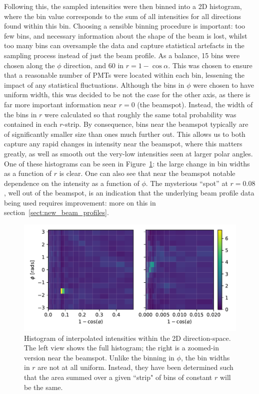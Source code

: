 Following this, the sampled intensities were then binned into a 2D histogram, where the bin value corresponds to the sum of all intensities for all directions found within this bin. Choosing a sensible binning procedure is important: too few bins, and necessary information about the shape of the beam is lost, whilst too many bins can oversample the data and capture statistical artefacts in the sampling process instead of just the beam profile. As a balance, 15 bins were chosen along the $\phi$ direction, and 60 in $r=1-\cos\alpha$. This was chosen to ensure that a reasonable number of PMTs were located within each bin, lessening the impact of any statistical fluctuations. Although the bins in $\phi$ were chosen to have uniform width, this was decided to be not the case for the other axis, as there is far more important information near $r = 0$ (the beamspot). Instead, the width of the bins in $r$ were calculated so that roughly the same total probability was contained in each $r$-strip. By consequence, bins near the beamspot typically are of significantly smaller size than ones much further out. This allows us to both capture any rapid changes in intensity near the beamspot, where this matters greatly, as well as smooth out the very-low intensities seen at larger polar angles. One of these histograms can be seen in Figure~\ref{fig:hist_cdf_old_profile}: the large change in bin widths as a function of $r$ is clear. One can also see that near the beamspot notable dependence on the intensity as a function of $\phi$. The mysterious ``spot'' at $r = 0.08$, well out of the beamspot, is an indication that the underlying beam profile data being used requires improvement: more on this in section~\ref{sect:new_beam_profiles}.

\begin{figure}
    \centering
    \includegraphics[width=\linewidth]{5_SMELLIESimulation/images/FS055_60_alpha_15_phi_hist.pdf}
    \caption{Histogram of interpolated intensities within the 2D direction-space. The left view shows the full histogram; the right is a zoomed-in version near the beamspot. Unlike the binning in $\phi$, the bin widths in $r$ are not at all uniform. Instead, they have been determined such that the area summed over a given ``strip" of bins of constant $r$ will be the same.}
    \label{fig:hist_cdf_old_profile}
\end{figure}

